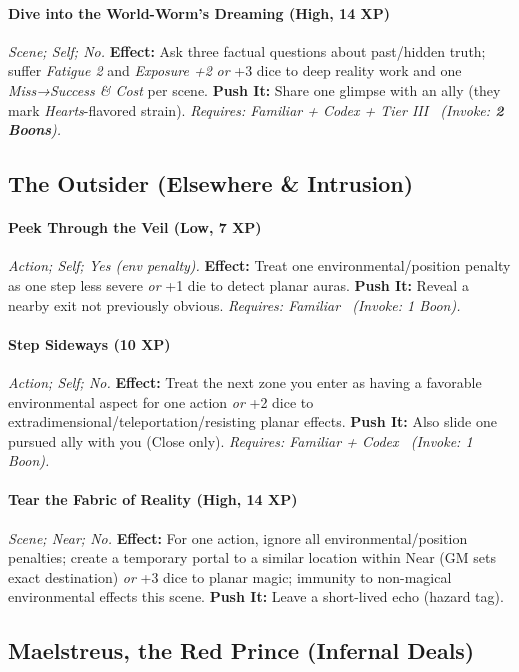 \documentclass[12pt,twoside]{book}
\begin{document}
\paragraph{Dive into the World-Worm’s Dreaming (High, 14 XP)} \emph{Scene; Self; No.}
\textbf{Effect:} Ask three factual questions about past/hidden truth; suffer \emph{Fatigue 2} and \emph{Exposure +2} \emph{or} +3 dice to deep reality work and one \emph{Miss→Success \& Cost} per scene.
\textbf{Push It:} Share one glimpse with an ally (they mark \emph{Hearts}-flavored strain).
\emph{Requires: Familiar + Codex + Tier III \ (\textit{Invoke:} \textbf{2 Boons}).}

\subsection{The Outsider (Elsewhere \& Intrusion)}
\paragraph{Peek Through the Veil (Low, 7 XP)} \emph{Action; Self; Yes (env penalty).}
\textbf{Effect:} Treat one environmental/position penalty as one step less severe \emph{or} +1 die to detect planar auras.
\textbf{Push It:} Reveal a nearby exit not previously obvious.
\emph{Requires: Familiar \ (\textit{Invoke:} 1 Boon).}
\paragraph{Step Sideways (10 XP)} \emph{Action; Self; No.}
\textbf{Effect:} Treat the next zone you enter as having a favorable environmental aspect for one action \emph{or} +2 dice to extradimensional/teleportation/resisting planar effects.
\textbf{Push It:} Also slide one pursued ally with you (Close only).
\emph{Requires: Familiar + Codex \ (\textit{Invoke:} 1 Boon).}
\paragraph{Tear the Fabric of Reality (High, 14 XP)} \emph{Scene; Near; No.}
\textbf{Effect:} For one action, ignore all environmental/position penalties; create a temporary portal to a similar location within Near (GM sets exact destination) \emph{or} +3 dice to planar magic; immunity to non-magical environmental effects this scene.
\textbf{Push It:} Leave a short-lived echo (hazard tag).

\subsection{Maelstreus, the Red Prince (Infernal Deals)}
\end{document}

